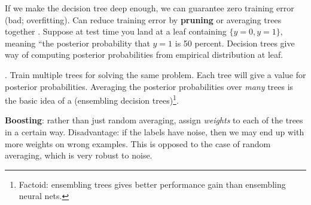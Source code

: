\documentclass[12pt]{article}
\newcommand{\myspace}{\vspace{2\bigskipamount}}
\newcommand\p{\Needspace{10\baselineskip} \noindent}
\begin{document}
\begin{center}
\end{center}

If we make the decision tree deep enough, we can guarantee zero training error (bad; overfitting). Can reduce training error by \textbf{pruning} or averaging trees together \purple{[50:00]}. Suppose at test time you land at a leaf containing $\{y = 0, y = 1 \}$, meaning ``the posterior probability that $y = 1$ is 50 percent. Decision trees give way of computing posterior probabilities from empirical distribution at leaf.

\myspace
\p {}. Train multiple trees for solving the same problem. Each tree will give a value for posterior probabilities. Averaging the posterior probabilities over \textit{many} trees is the basic idea of a  (ensembling decision trees)\footnote{Factoid: ensembling trees gives better performance gain than ensembling neural nets.}. 
\begin{compactitem}
\item \textbf{Boosting}: rather than just random averaging, assign \textit{weights} to each of the trees in a certain way. Disadvantage: if the labels have noise, then we may end up with more weights on wrong examples. This is opposed to the case of random averaging, which is very robust to noise. 
\end{compactitem}
\end{document}
